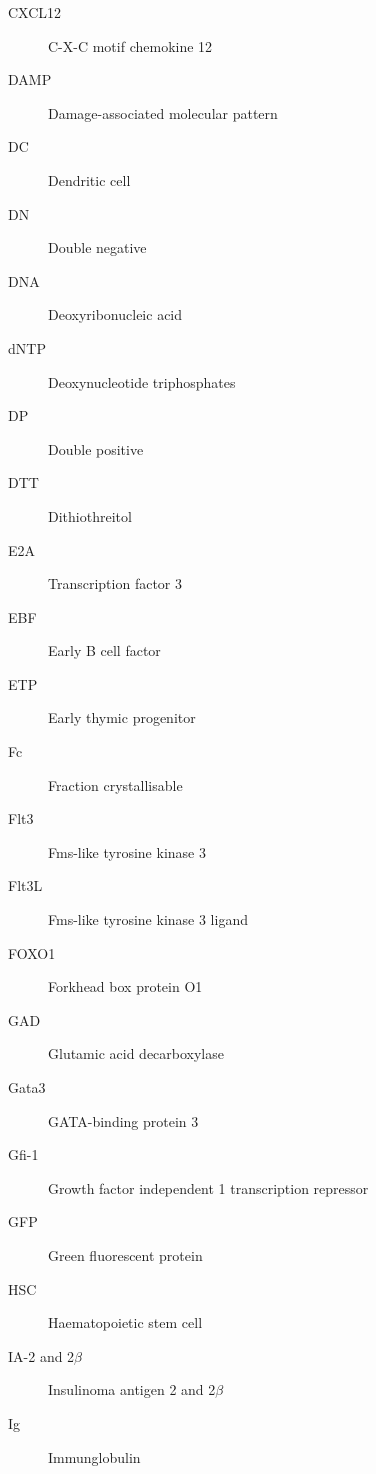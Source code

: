 \begin{description}
\item[CXCL12]
C-X-C motif chemokine 12

\item[DAMP]
Damage-associated molecular pattern

\item[DC]
Dendritic cell

\item[DN]
Double negative

\item[DNA]
Deoxyribonucleic acid

\item[dNTP]
Deoxynucleotide triphosphates

\item[DP]
Double positive

\item[DTT]
Dithiothreitol

\item[E2A]
Transcription factor 3

\item[EBF]
Early B cell factor

\item[ETP]
Early thymic progenitor

\item[Fc]
Fraction crystallisable

\item[Flt3]
Fms-like tyrosine kinase 3

\item[Flt3L]
Fms-like tyrosine kinase 3 ligand

\item[FOXO1]
Forkhead box protein O1

\item[GAD]
Glutamic acid decarboxylase

\item[Gata3]
GATA-binding protein 3

\item[Gfi-1]
Growth factor independent 1 transcription repressor

\item[GFP]
Green fluorescent protein

\item[HSC]
Haematopoietic stem cell

\item[IA-2 and 2$\beta$]
Insulinoma antigen 2 and 2$\beta$

\item[Ig]
Immunglobulin


\end{description}

